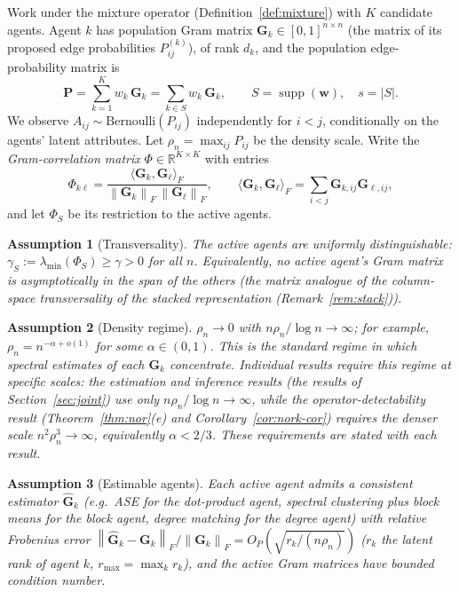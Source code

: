 \documentclass[12pt]{article}
\makeatletter
\newtheorem{assumption}{Assumption}
\def\subsection{\@startsection{subsection}{2}{\z@}{-0.13in}{0.03in}{\normalsize\bf\raggedright}}
\newcommand{\R}{\mathbb{R}}
\newcommand{\1}{\mathbf{1}}
\newcommand{\Pmat}{\mathbf{P}}
\newcommand{\bw}{\mathbf{w}}
\newcommand{\norm}[1]{\left\lVert#1\right\rVert}
\newcommand{\abs}[1]{\left\lvert#1\right\rvert}
\newcommand{\inner}[2]{\langle #1, #2 \rangle}
\makeatother
\begin{document}
\subsection{Setup and assumptions}
Work under the mixture operator (Definition~\ref{def:mixture}) with $K$ candidate agents. Agent $k$
has population Gram matrix $\mathbf{G}_k\in[0,1]^{n\times n}$ (the matrix of its proposed edge
probabilities $P^{(k)}_{ij}$), of rank $d_k$, and the population edge-probability matrix is
\[
\Pmat=\sum_{k=1}^K w_k\,\mathbf{G}_k=\sum_{k\in S}w_k\,\mathbf{G}_k,
\qquad S=\operatorname{supp}(\bw),\quad s=\abs{S}.
\]
We observe $A_{ij}\sim\mathrm{Bernoulli}(P_{ij})$ independently for $i<j$, conditionally on the
agents' latent attributes. Let $\rho_n=\max_{ij}P_{ij}$ be the density scale. Write the
\emph{Gram-correlation matrix} $\Phi\in\R^{K\times K}$ with entries
\[
\Phi_{k\ell}=\frac{\inner{\mathbf{G}_k}{\mathbf{G}_\ell}_F}{\norm{\mathbf{G}_k}_F\,
\norm{\mathbf{G}_\ell}_F},\qquad
\inner{\mathbf{G}_k}{\mathbf{G}_\ell}_F=\sum_{i<j}\mathbf{G}_{k,ij}\mathbf{G}_{\ell,ij},
\]
and let $\Phi_{S}$ be its restriction to the active agents.

\begin{assumption}[Transversality]\label{ass:transversality}
The active agents are uniformly distinguishable: $\gamma_S:=\lambda_{\min}(\Phi_S)\ge\gamma>0$ for
all $n$. Equivalently, no active agent's Gram matrix is asymptotically in the span of the others (the
matrix analogue of the column-space transversality of the stacked representation
(Remark~\ref{rem:stack})).
\end{assumption}

\begin{assumption}[Density regime]\label{ass:density}
$\rho_n\to0$ with $n\rho_n/\log n\to\infty$; for example, $\rho_n=n^{-\alpha+o(1)}$ for some
$\alpha\in(0,1)$. This is the standard regime in which spectral estimates of each $\mathbf{G}_k$
concentrate. Individual results require this regime at specific scales: the estimation and inference
results (the results of Section~\ref{sec:joint}) use only $n\rho_n/\log n\to\infty$, while the
operator-detectability result (Theorem~\ref{thm:nor}(e) and Corollary~\ref{cor:nork-cor}) requires the
denser scale $n^2\rho_n^3\to\infty$, equivalently $\alpha<2/3$. These requirements are stated with
each result.
\end{assumption}

\begin{assumption}[Estimable agents]\label{ass:plugin}
Each active agent admits a consistent estimator $\widehat{\mathbf{G}}_k$ (e.g.\ ASE for the
dot-product agent, spectral clustering plus block means for the block agent, degree matching for the
degree agent) with relative Frobenius error
$\norm{\widehat{\mathbf{G}}_k-\mathbf{G}_k}_F/\norm{\mathbf{G}_k}_F=O_P(\sqrt{r_k/(n\rho_n)})$ ($r_k$ the latent rank of agent $k$, $r_{\max}=\max_k r_k$), and
the active Gram matrices have bounded condition number.
\end{assumption}
\end{document}
